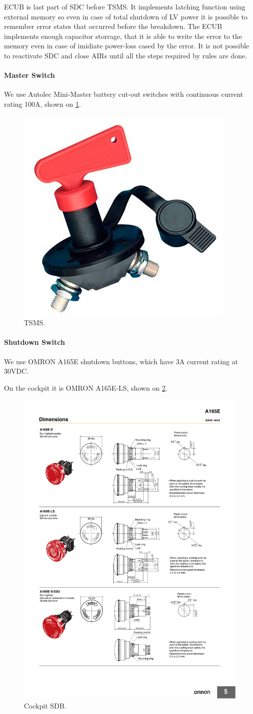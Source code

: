ECUB is last part of SDC before TSMS. It implements latching function using external memory so even in case of total shutdown of LV power it is possible to remember error states that occurred before the breakdown. The ECUB implements enough capacitor storrage, that it is able to write the error to the memory even in case of imidiate power-loss cased by the error. It is not possible to reactivate SDC and close AIRs until all the steps required by rules are done.

\paragraph{Master Switch}
We use Autolec Mini-Master battery cut-out switches with continuous current rating 100A, shown on \ref{fig:SDC-TSMS}.
\begin{figure}[H]
	\centering
	\includegraphics[width=.5\textwidth]{./img/SDC-TSMS.jpg}
	\caption{TSMS.}
	\label{fig:SDC-TSMS}
\end{figure}

\paragraph{Shutdown Switch}
We use OMRON A165E shutdown buttons, which have 3A current rating at 30VDC.

On the cockpit it is OMRON A165E-LS, shown on \ref{fig:SDC-A165E-LS}.
\begin{figure}[H]
	\centering
	\includegraphics[width=.5\textwidth]{./img/SDC-A165E-LS.pdf}
	\caption{Cockpit SDB.}
	\label{fig:SDC-A165E-LS}
\end{figure}

